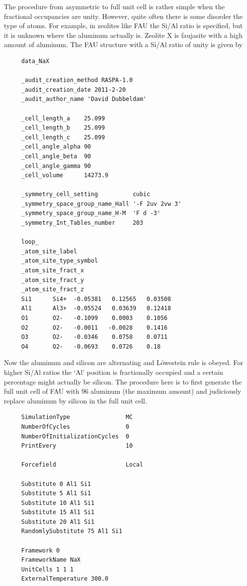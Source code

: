 The procedure from asymmetric to full unit cell is rather simple when the fractional occupancies are unity. However, quite often there
is some disorder the type of atoms. For example, in zeolites like FAU the Si/Al ratio is specified, but it is unknown where the aluminum
actually is. Zeolite X is faujasite with a high amount of aluminum. The FAU structure with a Si/Al ratio of unity is given by
\begin{verbatim}
     data_NaX
     
     _audit_creation_method RASPA-1.0
     _audit_creation_date 2011-2-20
     _audit_author_name 'David Dubbeldam'
     
     _cell_length_a    25.099
     _cell_length_b    25.099
     _cell_length_c    25.099
     _cell_angle_alpha 90
     _cell_angle_beta  90
     _cell_angle_gamma 90
     _cell_volume      14273.9
     
     _symmetry_cell_setting          cubic
     _symmetry_space_group_name_Hall '-F 2uv 2vw 3'
     _symmetry_space_group_name_H-M  'F d -3'
     _symmetry_Int_Tables_number     203
     
     loop_
     _atom_site_label
     _atom_site_type_symbol
     _atom_site_fract_x
     _atom_site_fract_y
     _atom_site_fract_z
     Si1      Si4+  -0.05381   0.12565   0.03508
     Al1      Al3+  -0.05524   0.03639   0.12418
     O1       O2-   -0.1099    0.0003    0.1056 
     O2       O2-   -0.0011   -0.0028    0.1416 
     O3       O2-   -0.0346    0.0758    0.0711 
     O4       O2-   -0.0693    0.0726    0.18   
\end{verbatim}
Now the aluminum and silicon are alternating and L\"owestein rule is obeyed. For higher Si/Al ratios
the `Al' position is fractionally occupied and a certain percentage might actually be silicon. The
procedure here is to first generate the full unit cell of FAU with 96 aluminum (the maximum amount)
and judiciously replace aluminum by silicon in the full unit cell.

\begin{verbatim}
     SimulationType                MC
     NumberOfCycles                0
     NumberOfInitializationCycles  0
     PrintEvery                    10
     
     Forcefield                    Local
     
     Substitute 0 Al1 Si1
     Substitute 5 Al1 Si1
     Substitute 10 Al1 Si1
     Substitute 15 Al1 Si1
     Substitute 20 Al1 Si1
     RandomlySubstitute 75 Al1 Si1
     
     Framework 0
     FrameworkName NaX
     UnitCells 1 1 1
     ExternalTemperature 300.0
\end{verbatim}

